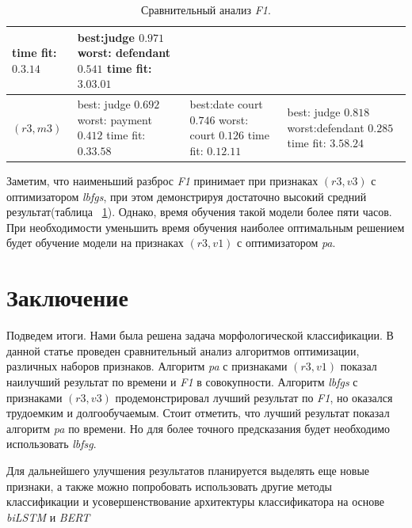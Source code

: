 \documentclass{csmathnotes}
\begin{document}
\begin{table}[!h]
\begin{center}
\begin{tabular}{|p{2.1cm}|p{2.5cm}|p{2.5cm}|p{2.5cm}|}
              time fit:\newline $0.3.14$
            & best:\newline  judge $0.971$\newline
              worst: \newline defendant  $0.541$\newline
              time fit:\newline $3.03.01$\\
            \hline
            $(r3, m3)$
            & best: \newline judge $0.692$ \newline
            worst: \newline payment $0.412$ \newline
            time fit: \newline  $0.33.58$
            & best:\newline   date court   $0.746$ \newline
             worst: \newline court $0.126$ \newline
             time fit: \newline $0.12.11$
            & best: \newline   judge $0.818$ \newline
              worst:\newline defendant $0.285$ \newline 
              time fit: \newline $3.58.24$\\
            \hline
        \end{tabular}
    \end{center}
    \caption{\label{tabl:table2}Сравнительный анализ \emph{F1}.}
\end{table}

Заметим, что наименьший разброс \emph{F1}  принимает при признаках $(r3,v3)$ с оптимизатором \emph{lbfgs}, при этом демонстрируя достаточно высокий средний результат(таблица ~\ref{tabl:table2}). Однако, время обучения такой модели более пяти часов. При необходимости уменьшить время обучения наиболее оптимальным решением будет обучение модели на признаках $(r3,v1)$ с оптимизатором \emph{pa}.

\section*{Заключение}
Подведем итоги. Нами была решена задача морфологической классификации. В данной статье проведен сравнительный анализ алгоритмов оптимизации, различных наборов признаков. Алгоритм \emph{pa} с признаками $(r3, v1)$ показал наилучший результат по времени и \emph{F1}  в совокупности. Алгоритм \emph{lbfgs}  с признаками $(r3, v3)$ продемонстрировал лучший результат по \emph{F1}, но оказался трудоемким и долгообучаемым. Стоит отметить, что лучший результат показал алгоритм \emph{pa} по времени. Но для более точного предсказания будет необходимо использовать \emph{lbfsg}.


Для дальнейшего улучшения результатов планируется выделять еще новые признаки, а также можно попробовать использовать другие методы классификации и усовершенствование архитектуры классификатора на основе \emph{biLSTM} и \emph{BERT}

\printbibliography
\end{document}
